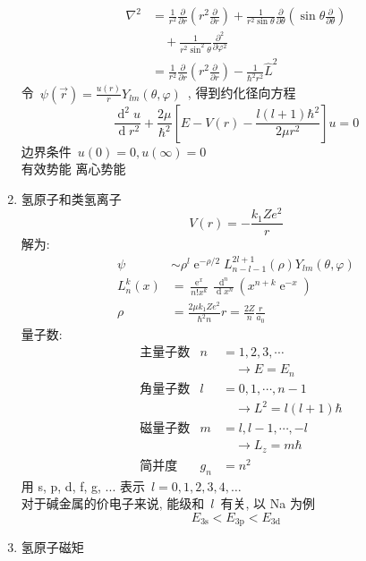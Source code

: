 \documentclass[11pt,a4paper,twocolumn,fleqn]{article}%
\DeclareMathOperator{\dif}{d}
\DeclareMathOperator{\e}{e}%
\renewcommand{\[}{~$}
\renewcommand{\]}{$~}%
\begin{document}
\begin{enumerate}
\begin{align}
	   \nabla^2 &= \frac{1}{r^2}\frac{\partial}{\partial r}\left(r^2\frac{\partial}{\partial r}\right) + \frac{1}{r^2\sin\theta}\frac{\partial}{\partial \theta}\left(\sin\theta\frac{\partial }{\partial\theta}\right) \nonumber\\
	   &\quad + \frac{1}{r^2\sin^2\theta}\frac{\partial^2}{\partial \varphi^2} \\
	   &= \frac{1}{r^2}\frac{\partial}{\partial r}\left(r^2\frac{\partial}{\partial r}\right) - \frac{1}{\hbar^2r^2}\hat L^2
	  \end{align}
	  令\[\psi(\vec r) = \frac{u(r)}{r}Y_{lm}(\theta,\varphi)\], 得到约化径向方程
	  \begin{equation}
	   \frac{\dif^2 u}{\dif r^2} + \frac{2\mu}{\hbar^2}\left[E - V(r) - \frac{l(l+1)\hbar^2}{2\mu r^2}\right]u = 0
	  \end{equation}
	  边界条件\[u(0) = 0,u(\infty) = 0\]\\
	  有效势能 离心势能
  \item 氢原子和类氢离子
  	\begin{equation}
  	 V(r) = -\frac{k_1Ze^2}{r}
  	\end{equation}
  	解为: 
  	\begin{align}
  	 \psi &\sim \rho^l\e^{-\rho/2}L_{n-l-1}^{2l+1}(\rho)Y_{lm}(\theta,\varphi) \\
  	 L_n^k(x) &= \frac{\e^x}{n!x^k}\frac{\dif^n}{\dif x^n}(x^{n+k}\e^{-x}) \\
  	 \rho &= \frac{2\mu k_1 Ze^2}{\hbar^2 n} r = \frac{2Z}{n}\frac{r}{a_0}
  	\end{align}
  	量子数:
  	\begin{align*}
  	 &\mbox{主量子数}&n &= 1,2,3,\cdots \\&&&\quad\to E = E_n \\
  	 &\mbox{角量子数}&l &= 0,1,\cdots,n-1 \\&&&\quad\to L^2 = l(l+1)\hbar \\
  	 &\mbox{磁量子数}&m &= l,l-1,\cdots,-l \\&&&\quad\to L_z = m\hbar \\
  	 &\mbox{简并度}& g_n &= n^2
  	\end{align*}
  	用 s, p, d, f, g, ... 表示\[l = 0,1,2,3,4,\dots\]\\
  	对于碱金属的价电子来说, 能级和\[l\]有关, 以 Na 为例
  	\begin{equation}
  	 E_{3\mbox{s}} < E_{3\mbox{p}} < E_{3\mbox{d}}
  	\end{equation}
  \item 氢原子磁矩\\

\end{enumerate}
\end{document}
